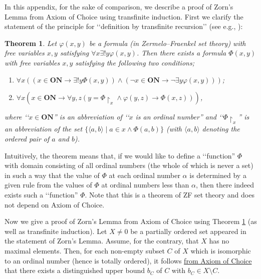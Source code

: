 \documentclass{article}
\newtheorem{theorem}{Theorem}
\begin{document}
In this appendix, for the sake of comparison, we describe a proof of Zorn's Lemma from Axiom of Choice using transfinite induction.
First we clarify the statement of the principle for \lq\lq definition by transfinite recursion\rq\rq{} (see e.g., \cite[Chapter I, Theorem 9,3]{Kunen}):
\begin{theorem}
\label{thm:transfinite_induction}
Let $\varphi(x,y)$ be a formula (in Zermelo--Fraenkel set theory) with free variables $x,y$ satisfying $\forall x \exists! y \varphi(x,y)$.
Then there exists a formula $\Phi(x,y)$ with free variables $x,y$ satisfying the following two conditions;
\begin{enumerate}
\item $\forall x ( (x \in \mathbf{ON} \to \exists! y \Phi(x,y)) \land (\neg x \in \mathbf{ON} \to \neg\exists y \varphi(x,y) ) )$;
\item $\forall x ( x \in \mathbf{ON} \to \forall y,z ( y = \Phi\!\upharpoonright_x \land \varphi(y,z) \to \Phi(x,z) ) )$,
\end{enumerate}
where \lq\lq $x \in \mathbf{ON}$'' is an abbreviation of \lq\lq $x$ is an ordinal number'' and \lq\lq $\Phi\!\upharpoonright_x$'' is an abbreviation of the set $\{\langle a,b \rangle \mid a \in x \land \Phi(a,b)\}$ (with $\langle a,b \rangle$ denoting the ordered pair of $a$ and $b$).
\end{theorem}
Intuitively, the theorem means that, if we would like to define a \lq\lq function'' $\Phi$ with domain consisting of all ordinal numbers (the whole of which is never a set) in such a way that the value of $\Phi$ at each ordinal number $\alpha$ is determined by a given rule from the values of $\Phi$ at ordinal numbers less than $\alpha$, then there indeed exists such a \lq\lq function'' $\Phi$.
Note that this is a theorem of ZF set theory and does not depend on Axiom of Choice.

Now we give a proof of Zorn's Lemma from Axiom of Choice using Theorem \ref{thm:transfinite_induction} (as well as transfinite induction).
Let $X \neq 0$ be a partially ordered set appeared in the statement of Zorn's Lemma.
Assume, for the contrary, that $X$ has no maximal elements.
Then, for each non-empty subset $C$ of $X$ which is isomorphic to an ordinal number (hence is totally ordered), it follows \underline{from Axiom of Choice} that there exists a distinguished upper bound $b_C$ of $C$ with $b_C \in X \setminus C$.
\end{document}
